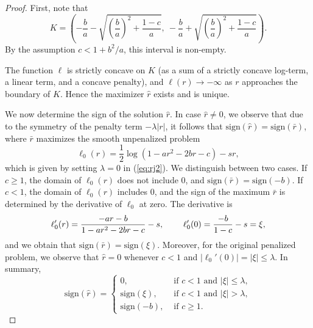 \documentclass[12pt]{amsart}
\numberwithin{equation}{section}
\numberwithin{equation}{section}
\theoremstyle{plain}
\theoremstyle{definition}
\newcommand{\sign}{\mathrm{sign}}
\begin{document}
\begin{proof}
First, note that
\begin{equation}\label{admissible domain}
K=\left( -\frac{b}{a} - \sqrt{\left(\frac{b}{a}\right)^2 + \frac{1-c}{a}},\ 
          -\frac{b}{a} + \sqrt{\left(\frac{b}{a}\right)^2 + \frac{1-c}{a}} \right).
\end{equation}
By the assumption $c<1+b^2/a$, this interval is non-empty. 

The function $\ell$ is strictly concave on $K$ (as a sum of a strictly concave log-term,
a linear term, and a concave penalty), and $\ell(r)\to -\infty$ as $r$ approaches the boundary of $K$. Hence the maximizer $\hat r$ exists and is unique.


We now determine the sign of the solution $\hat{r}$. In case $\hat{r}\neq 0$, we observe that due to the symmetry of the penalty term $-\lambda\vert r\vert$, it follows that $\sign(\hat{r})=\sign(\bar{r})$, where $\bar{r}$ maximizes the smooth unpenalized problem 
\begin{equation*}
    \ell_0(r)=\frac{1}{2}\log\left(1- a r^2 - 2b r -c  \right) - s r,
\end{equation*}
which is given by setting $\lambda=0$ in (\ref{eq:rj2}). We distinguish between two cases. If $c\geq 1$, the domain of $\ell_0(r)$ does not include $0$, and $\sign(\bar{r})=\sign(-b)$.  If $c<1$, the domain of $\ell_0(r)$ includes $0$, and the sign of the maximum $\bar{r}$ is determined by the derivative of $\ell_0$ at zero. The derivative is
\begin{equation*}
    \ell_0'(r)=\frac{ -ar -b}{1-a r^2 - 2b r -c} - s, \hspace{0.8cm} \ell_0'(0)=\frac{-b}{1-c}-s=\xi,
\end{equation*}
and we obtain that $\sign(\bar{r})=\sign(\xi)$. Moreover, for the original penalized problem, we observe that $\hat{r}=0$ whenever $c<1$ and $\vert \ell_0'(0)\vert=\vert \xi\vert\leq \lambda$. 
In summary,
\begin{equation}\label{eq:signs}
    \sign(\hat{r}) = 
    \begin{cases}
        0, & \text{ if } c<1 \text{ and } |\xi|\leq\lambda,\\
        \sign(\xi), & \text{ if } c<1 \text{ and } |\xi|>\lambda,\\
        \sign(-b), & \text{ if } c\geq1.
    \end{cases} 
\end{equation}


\end{proof}
\end{document}
